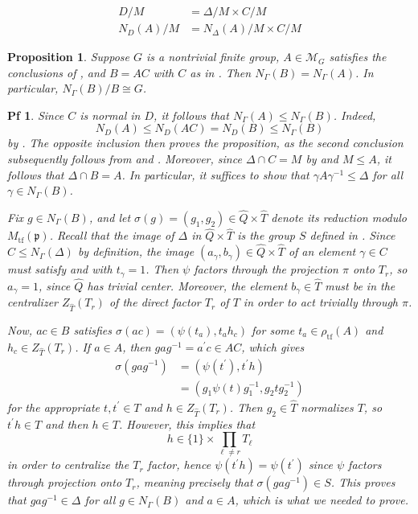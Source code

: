\documentclass[10pt,a4paper]{amsart}
\newtheorem{prop}{Proposition}
\newtheorem{pf}{Pf}
\newcommand{\Del}{\Delta}
\newcommand{\Gam}{\Gamma}
\newcommand{\calM}{\mathcal{M}}
\newcommand{\frakp}{\mathfrak{p}}
\newcommand{\gam}{\gamma}
\newcommand{\sig}{\sigma}
\newcommand{\wh}{\widehat}
\begin{document}
\begin{align}
D / M &= \Del / M \times C / M \label{eq:D/M} \\
N_D(A) / M &= N_\Del(A) / M \times C / M \label{eq:ND(A)/M}
\end{align}

\begin{prop}\label{prop:FinalNontrivialG}
Suppose $G$ is a nontrivial finite group, $A \in \calM_G$ satisfies the conclusions of , and $B = AC$ with $C$ as in . Then $N_\Gam(B) = N_\Gam(A)$. In particular, $N_\Gam(B) / B \cong G$.
\end{prop}

\begin{pf}
Since $C$ is normal in $D$, it follows that $N_\Gam(A) \le N_\Gam(B)$. Indeed,
\begin{equation}\label{eq:NDA}
N_D(A) \le N_D(AC) = N_D(B) \le N_\Gam(B)
\end{equation}
by . The opposite inclusion then proves the proposition, as the second conclusion subsequently follows from  and . Moreover, since $\Del \cap C = M$ by  and $M \le A$, it follows that $\Del \cap B = A$. In particular, it suffices to show that $\gam A \gam^{-1} \le \Del$ for all $\gam \in N_\Gam(B)$.

Fix $g \in N_\Gam(B)$, and let $\sig(g) = (g_1, g_2) \in \wh{Q} \times \wh{T}$ denote its reduction modulo $M_\mathrm{tf}(\frakp)$. Recall that the image of $\Del$ in $\wh{Q} \times \wh{T}$ is the group $S$ defined in . Since $C \le N_\Gam(\Del)$ by definition, the image $(a_\gam,b_\gam) \in \wh{Q} \times \wh{T}$ of an element $\gam \in C$ must satisfy  and  with $t_\gam = 1$. Then $\psi$ factors through the projection $\pi$ onto $T_r$, so $a_\gam = 1$, since $\wh{Q}$ has trivial center. Moreover, the element $b_\gam \in \wh{T}$ must be in the centralizer $Z_{\wh{T}}(T_r)$ of the direct factor $T_r$ of $T$ in order to act trivially through $\pi$.

Now, $ac \in B$ satisfies $\sig(ac) = (\psi(t_a), t_a h_c)$ for some $t_a \in \rho_{\mathrm{tf}}(A)$ and $h_c \in Z_{\wh{T}}(T_r)$. If $a \in A$, then $g a g^{-1} = a^\prime c \in AC$, which gives
\begin{align}
\sig\!\left(g a g^{-1}\right) &= \left(\psi(t^\prime), t^\prime h\right) \nonumber \\
&= \left(g_1 \psi(t) g_1^{-1}, g_2 t g_2^{-1}\right) \label{eq:ACendgame}
\end{align}
for the appropriate $t, t^\prime \in T$ and $h \in Z_{\wh{T}}(T_r)$. Then $g_2 \in \wh{T}$ normalizes $T$, so $t^\prime h \in T$ and then $h \in T$. However, this implies that
\begin{equation}\label{eq:hCentralizes}
h \in \{1\} \times \prod_{\ell \neq r} T_\ell
\end{equation}
in order to centralize the $T_r$ factor, hence $\psi(t^\prime h) = \psi(t^\prime)$ since $\psi$ factors through projection onto $T_r$, meaning precisely that $\sig(g a g^{-1}) \in S$. This proves that $g a g^{-1} \in \Del$ for all $g \in N_\Gam(B)$ and $a \in A$, which is what we needed to prove.
\end{pf}
\end{document}
